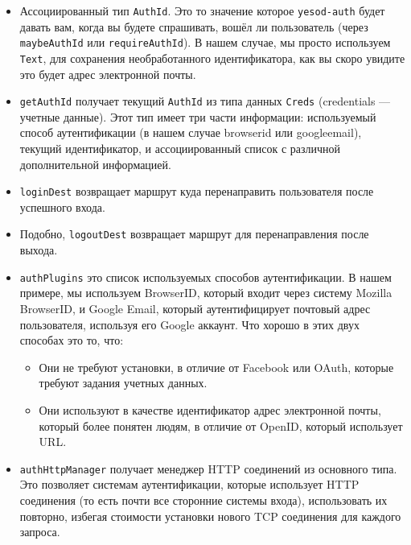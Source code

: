 \begin{itemize}
    \item Ассоциированный тип \lstinline'AuthId'. Это то значение которое \lstinline'yesod-auth' будет давать вам, когда вы будете спрашивать, вошёл ли пользователь (через \lstinline'maybeAuthId' или \lstinline'requireAuthId'). В нашем случае, мы просто используем \lstinline'Text', для сохранения необработанного идентификатора, как вы скоро увидите это будет адрес электронной почты. 

    \item \lstinline'getAuthId' получает текущий \lstinline'AuthId' из типа данных \lstinline'Creds' (credentials --- учетные данные). Этот тип имеет три части информации: используемый способ аутентификации (в нашем случае browserid или googleemail), текущий идентификатор, и ассоциированный список с различной дополнительной информацией.

    \item \lstinline'loginDest' возвращает маршрут куда перенаправить пользователя после успешного входа.

    \item Подобно, \lstinline'logoutDest' возвращает маршрут для перенаправления после выхода. 

    \item \lstinline'authPlugins' это список используемых способов аутентификации. В нашем примере, мы используем BrowserID, который входит через систему Mozilla BrowserID, и Google Email, который аутентифицирует почтовый адрес пользователя, используя его Google аккаунт. Что хорошо в этих двух способах это то, что:
    
    \begin{itemize}
        \item Они не требуют установки, в отличие от Facebook или OAuth, которые требуют задания учетных данных.
        
        \item Они используют в качестве идентификатор адрес электронной почты, который более понятен людям, в отличие от OpenID, который использует URL. 
    \end{itemize}
    
    \item \lstinline'authHttpManager' получает менеджер HTTP соединений из основного типа. Это позволяет системам аутентификации, которые использует HTTP соединения (то есть почти все сторонние системы входа), использовать их повторно, избегая стоимости установки нового TCP соединения для каждого запроса.
\end{itemize}

